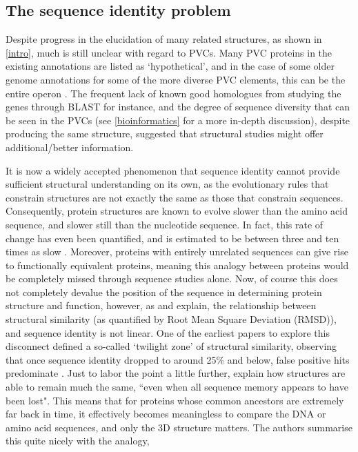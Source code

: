 \subsection{The sequence identity problem}
Despite progress in the elucidation of many related structures, as shown in \vref{intro}, much is still unclear with regard to PVCs. Many PVC proteins in the existing \Pa{} annotations are listed as `hypothetical', and in the case of some older genome annotations for some of the more diverse PVC elements, this can be the entire operon \citep{Duchaud2003}. The frequent lack of known good homologues from studying the genes through BLAST for instance, and the degree of sequence diversity that can be seen in the PVCs (see \vref{bioinformatics} for a more in-depth discussion), despite producing the same structure, suggested that structural studies might offer additional/better information.

It is now a widely accepted phenomenon that sequence identity cannot provide sufficient structural understanding on its own, as the evolutionary rules that constrain structures are not exactly the same as those that constrain sequences. Consequently, protein structures are known to evolve slower than the amino acid sequence, and slower still than the nucleotide sequence. In fact, this rate of change has even been quantified, and is estimated to be between three and ten times as slow \citep{Illergard2009}. Moreover, proteins with entirely unrelated sequences can give rise to functionally equivalent proteins, meaning this analogy between proteins would be completely missed through sequence studies alone. Now, of course this does not completely devalue the position of the sequence in determining protein structure and function, however, as \cite{Illergard2009} and \cite{Chothia1986} explain, the relationship between structural similarity (as quantified by Root Mean Square Deviation (RMSD)), and sequence identity is not linear. One of the earliest papers to explore this disconnect defined a so-called `twilight zone' of structural similarity, observing that once sequence identity dropped to around 25\% and below, false positive hits predominate \citep{rost1999twilight}. Just to labor the point a little further, \cite{Holm1996} explain how structures are able to remain much the same, ``even when all sequence memory appears
to have been lost". This means that for proteins whose common ancestors are extremely far back in time, it effectively becomes meaningless to compare the DNA or amino acid sequences, and only the 3D structure matters. The authors summarise this quite nicely with the analogy, 

